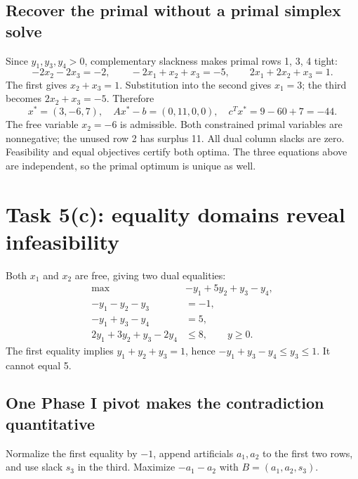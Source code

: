 \documentclass[11pt,a4paper]{article}
\begin{document}
\subsection{Recover the primal without a primal simplex solve}
Since $y_1,y_3,y_4>0$, complementary slackness makes primal rows 1, 3, 4 tight:
\[
  -2x_2-2x_3=-2,\qquad -2x_1+x_2+x_3=-5,\qquad
  2x_1+2x_2+x_3=1.
\]
The first gives $x_2+x_3=1$. Substitution into the second gives $x_1=3$;
the third becomes $2x_2+x_3=-5$. Therefore
\[
  x^*=(3,-6,7),\quad Ax^*-b=(0,11,0,0),\quad
  c^Tx^*=9-60+7=-44.
\]
The free variable $x_2=-6$ is admissible. Both constrained primal variables are
nonnegative; the unused row 2 has surplus 11. All dual column slacks are zero.
Feasibility and equal objectives certify both optima. The three equations above
are independent, so the primal optimum is unique as well.

\section{Task 5(c): equality domains reveal infeasibility}\label{sec:task5c}
Both $x_1$ and $x_2$ are free, giving two dual equalities:
\[
  \begin{aligned}
    \max\quad &-y_1+5y_2+y_3-y_4,\\
    -y_1-y_2-y_3&=-1,\\
    -y_1+y_3-y_4&=5,\\
    2y_1+3y_2+y_3-2y_4&\leq8,\qquad y\geq0.
  \end{aligned}
\]
The first equality implies $y_1+y_2+y_3=1$, hence
$-y_1+y_3-y_4\leq y_3\leq1$. It cannot equal 5.

\subsection{One Phase I pivot makes the contradiction quantitative}
Normalize the first equality by $-1$, append artificials $a_1,a_2$ to the
first two rows, and use slack $s_3$ in the third. Maximize $-a_1-a_2$ with
$B=(a_1,a_2,s_3)$.
\end{document}
